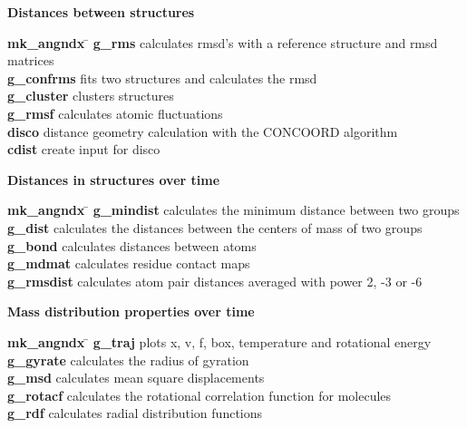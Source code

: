 \begin{description}
\item {\large\bf Distances between structures}
\vspace{-2ex}\begin{tabbing}
{\bf mk\_angndx} \= \kill
{\bf g\_rms} \> calculates rmsd's with a reference structure and rmsd matrices \\
{\bf g\_confrms} \> fits two structures and calculates the rmsd  \\
{\bf g\_cluster} \> clusters structures \\
{\bf g\_rmsf} \> calculates atomic fluctuations \\
{\bf disco} \> distance geometry calculation with the CONCOORD algorithm \\
{\bf cdist} \> create input for disco \\
\end{tabbing}\vspace{-2ex}

\item {\large\bf Distances in structures over time}
\vspace{-2ex}\begin{tabbing}
{\bf mk\_angndx} \= \kill
{\bf g\_mindist} \> calculates the minimum distance between two groups \\
{\bf g\_dist} \> calculates the distances between the centers of mass of two groups \\
{\bf g\_bond} \> calculates distances between atoms \\
{\bf g\_mdmat} \> calculates residue contact maps \\
{\bf g\_rmsdist} \> calculates atom pair distances averaged with power 2, -3 or -6 \\
\end{tabbing}\vspace{-2ex}

\item {\large\bf Mass distribution properties over time}
\vspace{-2ex}\begin{tabbing}
{\bf mk\_angndx} \= \kill
{\bf g\_traj} \> plots x, v, f, box, temperature and rotational energy \\
{\bf g\_gyrate} \> calculates the radius of gyration \\
{\bf g\_msd} \> calculates mean square displacements \\
{\bf g\_rotacf} \> calculates the rotational correlation function for molecules \\
{\bf g\_rdf} \> calculates radial distribution functions \\
\end{tabbing}\vspace{-2ex}


\end{description}
